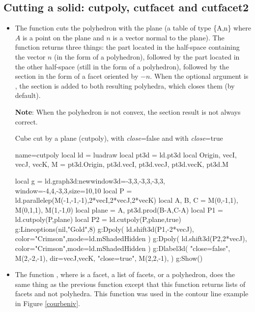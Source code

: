 \subsection{Cutting a solid: cutpoly, cutfacet and cutfacet2}

\begin{itemize}
    \item The function  cuts the polyhedron  with the plane  (a ​​table of type \{A,n\} where $A$ is a point on the plane and $n$ is a vector normal to the plane). The function returns three things: the part located in the half-space containing the vector $n$ (in the form of a polyhedron), followed by the part located in the other half-space (still in the form of a polyhedron), followed by the section in the form of a facet oriented by $-n$. When the optional argument  is \true, the section is added to both resulting polyhedra, which closes them (\false by default).

\textbf{Note}: When the polyhedron  is not convex, the section result is not always correct.

\begin{demo}{Cube cut by a plane (cutpoly), with \emph{close}=false and with \emph{close}=true}
\begin{luadraw}{name=cutpoly}
local ld = luadraw
local pt3d = ld.pt3d
local Origin, vecI, vecJ, vecK, M = pt3d.Origin, pt3d.vecI, pt3d.vecJ, pt3d.vecK, pt3d.M

local g = ld.graph3d:new{window3d={-3,3,-3,3,-3,3}, window={-4,4,-3,3},size={10,10}}
local P = ld.parallelep(M(-1,-1,-1),2*vecI,2*vecJ,2*vecK)
local A, B, C = M(0,-1,1), M(0,1,1), M(1,-1,0)
local plane = {A, pt3d.prod(B-A,C-A)}
local P1 = ld.cutpoly(P,plane)
local P2 = ld.cutpoly(P,plane,true)
g:Lineoptions(nil,"Gold",8)
g:Dpoly( ld.shift3d(P1,-2*vecJ), {color="Crimson",mode=ld.mShadedHidden} )
g:Dpoly( ld.shift3d(P2,2*vecJ), {color="Crimson",mode=ld.mShadedHidden} )
g:Dlabel3d(
    "close=false", M(2,-2,-1), {dir={vecJ,vecK}},
    "close=true", M(2,2,-1), {} )
g:Show()
\end{luadraw}
\end{demo}

    \item The function , where  is a facet, a list of facets, or a polyhedron, does the same thing as the previous function except that this function returns lists of facets and not polyhedra. This function was used in the contour line example in Figure \ref{courbeniv}.
    

\end{itemize}
